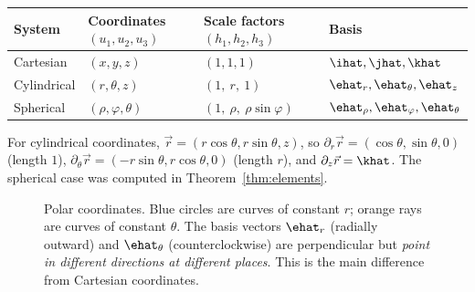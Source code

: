 \begin{example}
\begin{center}
\small\renewcommand{\arraystretch}{1.3}
\begin{tabular}{@{}llll@{}}
\toprule
System & Coordinates $(u_1,u_2,u_3)$ & Scale factors $(h_1,h_2,h_3)$ & Basis \\
\midrule
Cartesian & $(x,y,z)$ & $(1,1,1)$ & $\ihat,\jhat,\khat$ \\
Cylindrical & $(r,\theta,z)$ & $(1,\ r,\ 1)$ & $\ehat_r,\ehat_\theta,\ehat_z$ \\
Spherical & $(\rho,\varphi,\theta)$ & $(1,\ \rho,\ \rho\sin\varphi)$ & $\ehat_\rho,\ehat_\varphi,\ehat_\theta$ \\
\bottomrule
\end{tabular}
\end{center}
For cylindrical coordinates, $\vec r=(r\cos\theta,r\sin\theta,z)$, so $\partial_r\vec r=(\cos\theta,\sin\theta,0)$ (length $1$), $\partial_\theta\vec r=(-r\sin\theta,r\cos\theta,0)$ (length $r$), and $\partial_z\vec r=\khat$. The spherical case was computed in Theorem~\ref{thm:elements}.
\end{example}

\begin{figure}[ht]
\centering
{}
\caption{Polar coordinates. Blue circles are curves of constant $r$; orange rays are curves of constant $\theta$. The basis vectors $\ehat_r$ (radially outward) and $\ehat_\theta$ (counterclockwise) are perpendicular but \emph{point in different directions at different places}. This is the main difference from Cartesian coordinates.}
\label{fig:polarbasis}
\end{figure}

